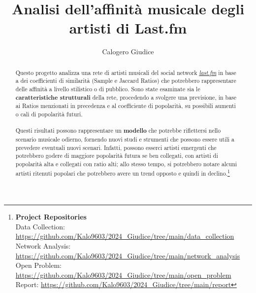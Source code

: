 \documentclass[sigchi]{acmart}
\begin{document}
%
\title{Analisi dell'affinità musicale degli artisti di Last.fm}

%
\author{Calogero Giudice}

\renewcommand{\shortauthors}{Calogero Giudice}


\begin{abstract}
Questo progetto analizza una rete di artisti musicali del social network {\itshape \href{https://www.last.fm/home}{last.fm}} in base a dei coefficienti di similarità (Sample e Jaccard Ratios) che potrebbero rappresentare delle affinità a livello stilistico o di pubblico. Sono state esaminate sia le {\bfseries caratteristiche strutturali} della rete, procedendo a svolgere una previsione, in base ai Ratios menzionati in precedenza e al coefficiente di popolarità, su possibili aumenti o cali di popolarità futuri. \\ \\ Questi risultati possono rappresentare un {\bfseries modello} che potrebbe riflettersi nello scenario musicale odierno, fornendo nuovi studi e strumenti che possono essere utili a prevedere eventuali nuovi scenari. Infatti, possono esserci artisti emergenti che potrebbero godere di maggiore popolarità futura se ben collegati, con artisti di popolarità alta e collegati con ratio alti; allo stesso tempo, si potrebbero notare alcuni artisti ritenuti popolari che potrebbero avere un trend opposto e quindi in declino.\footnote{
{\bf Project Repositories}\\
\noindent Data Collection: \url{https://github.com/Kalo9603/2024_Giudice/tree/main/data_collection}\\
\noindent Network Analysis: \url{https://github.com/Kalo9603/2024_Giudice/tree/main/network_analysis}\\
\noindent Open Problem: \url{https://github.com/Kalo9603/2024_Giudice/tree/main/open_problem}\\
\noindent Report: \url{https://github.com/Kalo9603/2024_Giudice/tree/main/report}}
\end{abstract}
\end{document}
